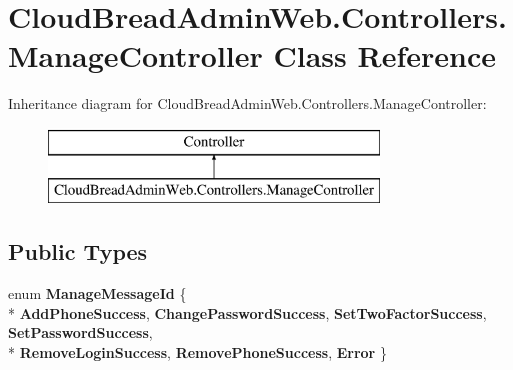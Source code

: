 \hypertarget{a00133}{}\section{Cloud\+Bread\+Admin\+Web.\+Controllers.\+Manage\+Controller Class Reference}
\label{a00133}
Inheritance diagram for Cloud\+Bread\+Admin\+Web.\+Controllers.\+Manage\+Controller\+:\begin{figure}[H]
\begin{center}
\leavevmode
\includegraphics[height=2.000000cm]{a00133}
\end{center}
\end{figure}
\subsection*{Public Types}
\begin{DoxyCompactItemize}
\item 
enum {\bfseries Manage\+Message\+Id} \{ \\*
{\bfseries Add\+Phone\+Success}, 
{\bfseries Change\+Password\+Success}, 
{\bfseries Set\+Two\+Factor\+Success}, 
{\bfseries Set\+Password\+Success}, 
\\*
{\bfseries Remove\+Login\+Success}, 
{\bfseries Remove\+Phone\+Success}, 
{\bfseries Error}
 \}\hypertarget{a00133_a9fa3bbaaee70bae3844f95a7c379719d}{}\label{a00133_a9fa3bbaaee70bae3844f95a7c379719d}

\end{DoxyCompactItemize}
